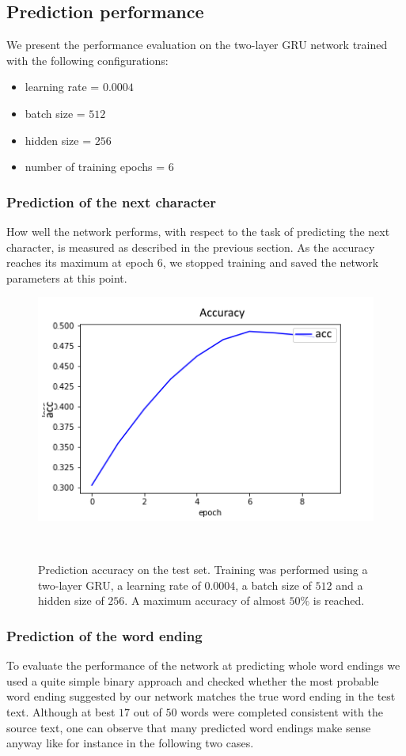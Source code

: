 \documentclass[11pt,a4paper,bibliography=totocnumbered,listof=totocnumbered]{scrartcl}
\begin{document}
\subsection{Prediction performance}
We present the performance evaluation on the two-layer GRU network trained with the following configurations:
\begin{itemize}
	\item learning rate = $0.0004$
	\item batch size = $512$
	\item hidden size = $256$
	\item number of training epochs = $6$
\end{itemize} 

\subsubsection{Prediction of the next character}
How well the network performs, with respect to the task of predicting the next character, is measured as described in the previous section. As the accuracy reaches its maximum at epoch 6, we stopped training and saved the network parameters at this point. 

\begin{figure}[!ht]
   \begin{minipage}{\textwidth}
     \centering
     \includegraphics[width=.4\textwidth]{acc_hs256_slow}
     \caption{Prediction accuracy on the test set. Training was performed using a two-layer GRU, a learning rate of $0.0004$, a batch size of $512$ and a hidden size of $256$. A maximum accuracy of almost $50\%$ is reached.}
     \label{fig:truenet}
   \end{minipage}\\[1em]   
\end{figure}

\subsubsection{Prediction of the word ending} \label{ssec:we}
To evaluate the performance of the network at predicting whole word endings we used a quite simple binary approach and checked whether the most probable word ending suggested by our network matches the true word ending in the test text. Although at best $17$ out of $50$ words were completed consistent with the source text, one can observe that many predicted word endings make sense anyway like for instance in the following two cases. \\
\end{document}
